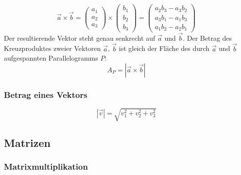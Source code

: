 \begin{equation}
	\overrightarrow{a} \times \overrightarrow{b} = \begin{pmatrix}a_1\\a_2\\a_3\end{pmatrix}
	\times \begin{pmatrix}b_1\\b_2\\b_3\end{pmatrix}
	= \begin{pmatrix}a_2b_3 - a_3b_2 \\ a_3b_1 - a_1b_3 \\ a_1b_2 - a_2b_1\end{pmatrix}
\end{equation}
Der resultierende Vektor steht genau senkrecht auf $\overrightarrow{a}$ und $\overrightarrow{b}$.
Der Betrag des Kreuzproduktes zweier Vektoren $\overrightarrow{a}$, $\overrightarrow{b}$ 
ist gleich der Fläche des durch $\overrightarrow{a}$ und $\overrightarrow{b}$
aufgespannten Parallelogramms $P$:
\begin{equation}
 	A_P = |\overrightarrow{a} \times \overrightarrow{b}|
\end{equation}

\subsubsection{Betrag eines Vektors}
\label{ssub:betrag_eines_vektors}

\begin{equation}
	|\overrightarrow{v}| = \sqrt{v_1^2 + v_2^2 + v_3^2}
\end{equation}

\subsection{Matrizen} 
\label{sub:matrizen}

\subsubsection{Matrixmultiplikation} 
\label{ssub:matrixmultiplikation}

